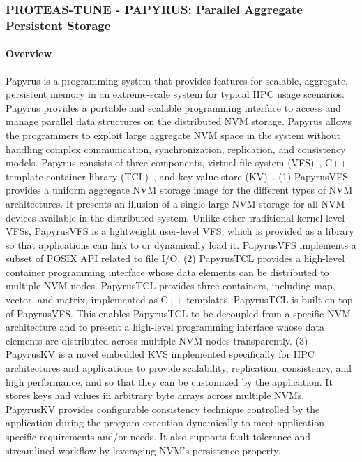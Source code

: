 \subsubsection{ PROTEAS-TUNE - PAPYRUS: Parallel Aggregate Persistent Storage}\label{s:papyrus}

\paragraph{Overview} 
Papyrus is a programming system that provides features for scalable, aggregate, persistent memory in an extreme-scale system for typical HPC usage scenarios. Papyrus provides a portable and scalable programming interface to access and manage parallel data structures on the distributed NVM storage. Papyrus allows the programmers to exploit large aggregate NVM space in the system without handling complex communication, synchronization, replication, and consistency models. Papyrus consists of three components, virtual file system (VFS)~\cite{Kim:2017:DIP}, C++ template container library (TCL)~\cite{Kim:2017:DIP}, and key-value store (KV)~\cite{Kim:2017:PHP}.
(1) PapyrusVFS provides a uniform aggregate NVM storage image for the different types of NVM architectures. It presents an illusion of a single large NVM storage for all NVM devices available in the distributed system. Unlike other traditional kernel-level VFSs, PapyrusVFS is a lightweight user-level VFS, which is provided as a library so that applications can link to or dynamically load it. PapyrusVFS implements a subset of POSIX API related to file I/O. (2) PapyrusTCL provides a high-level container programming interface whose data elements can be distributed to multiple NVM nodes. PapyrusTCL provides three containers, including map, vector, and matrix, implemented as C++ templates. PapyrusTCL is built on top of PapyrusVFS. This enables PapyrusTCL to be decoupled from a specific NVM architecture and to present a high-level programming interface whose data elements are distributed across multiple NVM nodes transparently. (3) PapyrusKV is a novel embedded KVS implemented specifically for HPC architectures and applications to provide scalability, replication, consistency, and high performance, and so that they can be customized by the application. It stores keys and values in arbitrary byte arrays across multiple NVMs. PapyrusKV provides configurable consistency technique controlled by the application during the program execution dynamically to meet application-specific requirements and/or needs. It also supports fault tolerance and streamlined workflow by leveraging NVM's persistence property.

